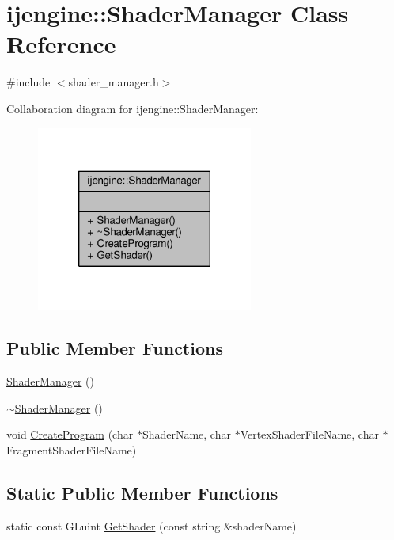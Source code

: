 \hypertarget{classijengine_1_1ShaderManager}{\section{ijengine\-:\-:Shader\-Manager Class Reference}
\label{classijengine_1_1ShaderManager}
}


{\ttfamily \#include $<$shader\-\_\-manager.\-h$>$}



Collaboration diagram for ijengine\-:\-:Shader\-Manager\-:\nopagebreak
\begin{figure}[H]
\begin{center}
\leavevmode
\includegraphics[width=202pt]{classijengine_1_1ShaderManager__coll__graph}
\end{center}
\end{figure}
\subsection*{Public Member Functions}
\begin{DoxyCompactItemize}
\item 
\hyperlink{classijengine_1_1ShaderManager_a7b64c6ab11f1ccb9b95c4bf59248d89c}{Shader\-Manager} ()
\item 
\hyperlink{classijengine_1_1ShaderManager_acfbc54fa76975c320a8078545a47a8a9}{$\sim$\-Shader\-Manager} ()
\item 
void \hyperlink{classijengine_1_1ShaderManager_a50a52860e644dada1fd3abac162a2c6e}{Create\-Program} (char $\ast$Shader\-Name, char $\ast$Vertex\-Shader\-File\-Name, char $\ast$Fragment\-Shader\-File\-Name)
\end{DoxyCompactItemize}
\subsection*{Static Public Member Functions}
\begin{DoxyCompactItemize}
\item 
static const G\-Luint \hyperlink{classijengine_1_1ShaderManager_acd75e97fa36a888d515e2c2c8552a3d1}{Get\-Shader} (const string \&shader\-Name)
\end{DoxyCompactItemize}


